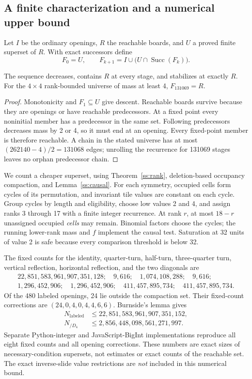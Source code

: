 \subsection{A finite characterization and a numerical upper bound}

Let $I$ be the ordinary openings, $R$ the reachable boards, and $U$ a
proved finite superset of $R$. With exact successors define
\[
 F_0=U,\qquad F_{k+1}=I\cup\bigl(U\cap\operatorname{Succ}(F_k)\bigr).
\]
\begin{proposition}\label{ss:rooted}
The sequence decreases, contains $R$ at every stage, and stabilizes
at exactly $R$. For the $4\times4$ rank-bounded universe of mass at
least 4, $F_{131069}=R$.
\end{proposition}
\begin{proof}
Monotonicity and $F_1\subseteq U$ give descent. Reachable boards survive
because they are openings or have reachable predecessors. At a fixed
point every noninitial member has a predecessor in the same set.
Following predecessors decreases mass by 2 or 4, so it must end at an
opening. Every fixed-point member is therefore reachable. A chain in
the stated universe has at most $(262140-4)/2=131068$ edges; unrolling
the recurrence for 131069 stages leaves no orphan predecessor chain.
\end{proof}

We count a cheaper superset, using Theorem~\ref{ss:rank}, deletion-based
occupancy compaction, and Lemma~\ref{ss:causal}. For each symmetry,
occupied cells form cycles of its permutation, and invariant tile values
are constant on each cycle. Group cycles by length and eligibility,
choose low values 2 and 4, and assign ranks 3 through 17 with a finite
integer recurrence. At rank $r$, at most $18-r$ unassigned occupied
\emph{cells} may remain. Binomial factors choose the cycles; the running
lower-rank mass and $f$ implement the causal test. Saturation at 32 units
of value 2 is safe because every comparison threshold is below 32.

The fixed counts for the identity, quarter-turn, half-turn, three-quarter
turn, vertical reflection, horizontal reflection, and the two diagonals are
\[
\begin{gathered}
22{,}851{,}583{,}961{,}907{,}351{,}128;\quad9{,}616;\quad1{,}074{,}108{,}288;
\quad9{,}616;\\
1{,}296{,}452{,}906;\quad1{,}296{,}452{,}906;\quad
411{,}457{,}895{,}734;\quad411{,}457{,}895{,}734.
\end{gathered}
\]
Of the 480 labeled openings, 24 lie outside the compaction set. Their
fixed-count corrections are $(24,0,4,0,4,4,6,6)$. Burnside's lemma gives
\begin{align*}
 N_{\mathrm{labeled}}&\le22{,}851{,}583{,}961{,}907{,}351{,}152,\\
 N_{/D_4}&\le2{,}856{,}448{,}098{,}561{,}271{,}997.
\end{align*}
Separate Python-integer and JavaScript-BigInt implementations reproduce
all eight fixed counts and all opening corrections. These numbers are
exact sizes of necessary-condition supersets, not estimates or exact
counts of the reachable set. The exact inverse-slide value restrictions
are \emph{not} included in this numerical bound.


